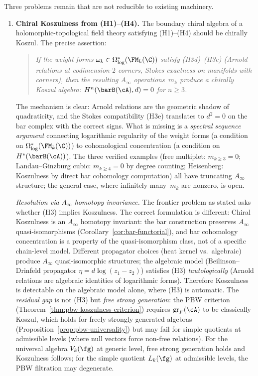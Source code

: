 Three problems remain that are not
reducible to existing machinery.

\begin{enumerate}
\item \textbf{Chiral Koszulness from (H1)--(H4).}
 The boundary chiral algebra of a holomorphic-topological
 field theory satisfying (H1)--(H4) should be chirally Koszul.
 The precise assertion:
 \begin{quote}
 \emph{If the weight forms
 $\omega_k \in \Omega^*_{\log}(\FM_k(\C))$
 satisfy (H3d)--(H3e)
 \textup{(}Arnold relations at codimension-$2$ corners,
 Stokes exactness on manifolds with corners\textup{)},
 then the resulting $A_\infty$ operations~$m_k$
 produce a chirally Koszul algebra:
 $H^n(\barB(\cA), d) = 0$ for $n \geq 3$.}
 \end{quote}
 The mechanism is clear: Arnold relations are the
 geometric shadow of quadraticity, and the Stokes compatibility
 (H3e) translates to $d^2 = 0$ on the bar complex with
 the correct signs. What is missing is a
 \emph{spectral sequence argument} connecting logarithmic
 regularity of the weight forms (a condition on
 $\Omega^*_{\log}(\FM_k(\C))$) to cohomological concentration
 (a condition on $H^*(\barB(\cA))$). The three verified
 examples (free multiplet: $m_{k \geq 3} = 0$; Landau--Ginzburg
 cubic: $m_{k \geq 4} = 0$ by degree counting; Heisenberg:
 Koszulness by direct bar cohomology computation) all have
 truncating $A_\infty$ structure; the general case, where
 infinitely many~$m_k$ are nonzero, is open.

 \emph{Resolution via $A_\infty$ homotopy invariance.}
 The frontier problem as stated asks whether (H3)
 implies Koszulness. The correct formulation is different:
 Chiral Koszulness is an $A_\infty$ homotopy invariant:
 the bar construction preserves $A_\infty$
 quasi-isomorphisms
 (Corollary~\ref{cor:bar-functorial}), and bar
 cohomology concentration is a property of the
 quasi-isomorphism class, not of a specific
 chain-level model. Different propagator choices
 (heat kernel vs.\ algebraic) produce $A_\infty$
 quasi-isomorphic structures; the algebraic model
 (Beilinson--Drinfeld propagator
 $\eta = d\log(z_1 - z_2)$) satisfies (H3)
 \emph{tautologically} (Arnold relations are algebraic
 identities of logarithmic forms). Therefore
 Koszulness is detectable on the algebraic model
 alone, where (H3) is automatic.
 The \emph{residual gap} is not (H3) but
 \emph{free strong generation}: the PBW criterion
 (Theorem~\ref{thm:pbw-koszulness-criterion})
 requires $\operatorname{gr}_F(\cA)$ to be
 classically Koszul, which holds for
 freely strongly generated algebras
 (Proposition~\ref{prop:pbw-universality}) but
 may fail for simple quotients at admissible levels
 (where null vectors force non-free relations).
 For the universal algebra $V_k(\fg)$ at generic
 level, free strong generation holds and
 Koszulness follows; for the simple quotient
 $L_k(\fg)$ at admissible levels, the PBW
 filtration may degenerate.


\end{enumerate}
